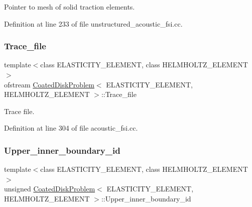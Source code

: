 Pointer to mesh of solid traction elements. 



Definition at line 233 of file unstructured\+\_\+acoustic\+\_\+fsi.\+cc.

\mbox{\label{classCoatedDiskProblem_a5a6336e64a200817fedd99a333d2c0be}} 
\subsubsection{\texorpdfstring{Trace\+\_\+file}{Trace\_file}}
{\footnotesize\ttfamily template$<$class E\+L\+A\+S\+T\+I\+C\+I\+T\+Y\+\_\+\+E\+L\+E\+M\+E\+NT, class H\+E\+L\+M\+H\+O\+L\+T\+Z\+\_\+\+E\+L\+E\+M\+E\+NT$>$ \\
ofstream \hyperlink{classCoatedDiskProblem}{Coated\+Disk\+Problem}$<$ E\+L\+A\+S\+T\+I\+C\+I\+T\+Y\+\_\+\+E\+L\+E\+M\+E\+NT, H\+E\+L\+M\+H\+O\+L\+T\+Z\+\_\+\+E\+L\+E\+M\+E\+NT $>$\+::Trace\+\_\+file\hspace{0.3cm}{\ttfamily [private]}}



Trace file. 



Definition at line 304 of file acoustic\+\_\+fsi.\+cc.

\mbox{\label{classCoatedDiskProblem_ae22c200ea010aa2420b96c2592034cd5}} 
\subsubsection{\texorpdfstring{Upper\+\_\+inner\+\_\+boundary\+\_\+id}{Upper\_inner\_boundary\_id}}
{\footnotesize\ttfamily template$<$class E\+L\+A\+S\+T\+I\+C\+I\+T\+Y\+\_\+\+E\+L\+E\+M\+E\+NT, class H\+E\+L\+M\+H\+O\+L\+T\+Z\+\_\+\+E\+L\+E\+M\+E\+NT$>$ \\
unsigned \hyperlink{classCoatedDiskProblem}{Coated\+Disk\+Problem}$<$ E\+L\+A\+S\+T\+I\+C\+I\+T\+Y\+\_\+\+E\+L\+E\+M\+E\+NT, H\+E\+L\+M\+H\+O\+L\+T\+Z\+\_\+\+E\+L\+E\+M\+E\+NT $>$\+::Upper\+\_\+inner\+\_\+boundary\+\_\+id\hspace{0.3cm}{\ttfamily [private]}}




